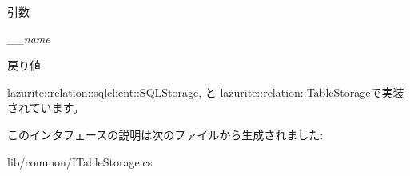\begin{DoxyParams}{引数}
\item[{\em \_\-\_\-name}]\end{DoxyParams}
\begin{DoxyReturn}{戻り値}

\end{DoxyReturn}


\hyperlink{classlazurite_1_1relation_1_1sqlclient_1_1_s_q_l_storage_acee858e25cf0ef20c657b89842fa9730}{lazurite::relation::sqlclient::SQLStorage}, と \hyperlink{classlazurite_1_1relation_1_1_table_storage_aaf6dac4136fc070b9c173b4c8231089d}{lazurite::relation::TableStorage}で実装されています。

このインタフェースの説明は次のファイルから生成されました:\begin{DoxyCompactItemize}
\item 
lib/common/ITableStorage.cs\end{DoxyCompactItemize}
